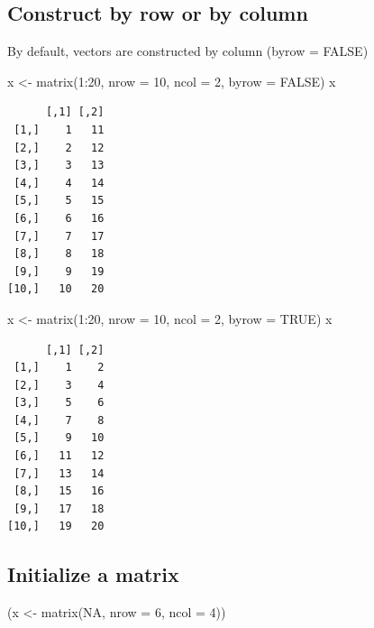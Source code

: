 \documentclass[
]{book}
\newenvironment{Shaded}{\begin{snugshade}}{\end{snugshade}}
\newcommand{\AttributeTok}[1]{\textcolor[rgb]{0.77,0.63,0.00}{#1}}
\newcommand{\ConstantTok}[1]{\textcolor[rgb]{0.00,0.00,0.00}{#1}}
\newcommand{\DecValTok}[1]{\textcolor[rgb]{0.00,0.00,0.81}{#1}}
\newcommand{\FunctionTok}[1]{\textcolor[rgb]{0.00,0.00,0.00}{#1}}
\newcommand{\NormalTok}[1]{#1}
\newcommand{\OtherTok}[1]{\textcolor[rgb]{0.56,0.35,0.01}{#1}}
\newcommand{\SpecialCharTok}[1]{\textcolor[rgb]{0.00,0.00,0.00}{#1}}
\begin{document}
\hypertarget{construct-by-row-or-by-column}{%
\subsection{Construct by row or by column}\label{construct-by-row-or-by-column}}

By default, vectors are constructed by column (byrow = FALSE)

\begin{Shaded}
\begin{Highlighting}[]
\NormalTok{x }\OtherTok{\textless{}{-}} \FunctionTok{matrix}\NormalTok{(}\DecValTok{1}\SpecialCharTok{:}\DecValTok{20}\NormalTok{, }\AttributeTok{nrow =} \DecValTok{10}\NormalTok{, }\AttributeTok{ncol =} \DecValTok{2}\NormalTok{, }\AttributeTok{byrow =} \ConstantTok{FALSE}\NormalTok{)}
\NormalTok{x}
\end{Highlighting}
\end{Shaded}

\begin{verbatim}
      [,1] [,2]
 [1,]    1   11
 [2,]    2   12
 [3,]    3   13
 [4,]    4   14
 [5,]    5   15
 [6,]    6   16
 [7,]    7   17
 [8,]    8   18
 [9,]    9   19
[10,]   10   20
\end{verbatim}

\begin{Shaded}
\begin{Highlighting}[]
\NormalTok{x }\OtherTok{\textless{}{-}} \FunctionTok{matrix}\NormalTok{(}\DecValTok{1}\SpecialCharTok{:}\DecValTok{20}\NormalTok{, }\AttributeTok{nrow =} \DecValTok{10}\NormalTok{, }\AttributeTok{ncol =} \DecValTok{2}\NormalTok{, }\AttributeTok{byrow =} \ConstantTok{TRUE}\NormalTok{)}
\NormalTok{x}
\end{Highlighting}
\end{Shaded}

\begin{verbatim}
      [,1] [,2]
 [1,]    1    2
 [2,]    3    4
 [3,]    5    6
 [4,]    7    8
 [5,]    9   10
 [6,]   11   12
 [7,]   13   14
 [8,]   15   16
 [9,]   17   18
[10,]   19   20
\end{verbatim}

\hypertarget{initialize-a-matrix}{%
\subsection{Initialize a matrix}\label{initialize-a-matrix}}

\begin{Shaded}
\begin{Highlighting}[]
\NormalTok{(x }\OtherTok{\textless{}{-}} \FunctionTok{matrix}\NormalTok{(}\ConstantTok{NA}\NormalTok{, }\AttributeTok{nrow =} \DecValTok{6}\NormalTok{, }\AttributeTok{ncol =} \DecValTok{4}\NormalTok{))}
\end{Highlighting}
\end{Shaded}
\end{document}
